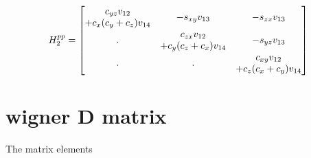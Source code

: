 \documentclass[twocolumn,showpacs,preprintnumbers,superscriptaddress,prb,floatfix,aps,10pt]{revtex4-1}
\begin{document}
\begin{equation}
H^{pp}_2 =
\begin{bmatrix}
              c_{yz} v_{12} & \multirow{2}{*}{$-s_{xy} v_{13}$} & \multirow{2}{*}{$-s_{zx} v_{13}$}  \\
+c_{x} (c_{y}+c_{z}) v_{14} &                                   &                                    \\
\multirow{2}{*}{.}          &               c_{zx} v_{12}       & \multirow{2}{*}{$-s_{yz} v_{13}$}  \\
                            & +c_{y} (c_{z}+c_{x}) v_{14}       &                                    \\
\multirow{2}{*}{.}          & \multirow{2}{*}{.}                &          c_{xy} v_{12}             \\ 
                            &                                   &        +c_{z} (c_{x}+c_{y}) v_{14} \\
\end{bmatrix}
\end{equation}






%
%
\section{wigner D matrix} \label{appendix:wigner}




The matrix elements
\end{document}
